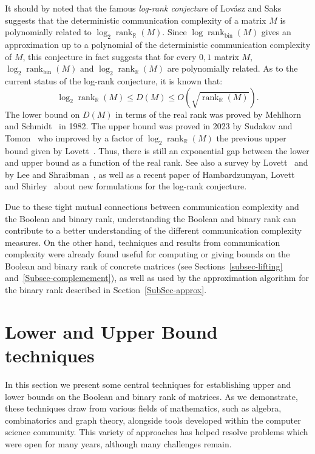 \documentclass[11pt]{article}
\newcommand{\rank}{\mathop{\mathrm{rank}}}
\newcommand{\Rbin}{{\rank}_{\mathrm{bin}}}
\newcommand{\Rreal}{{\rank}_\mathbb{R}}
\begin{document}
It should by noted that the famous {\em log-rank conjecture} of Lov{\'a}sz and Saks~\cite{LovaszS88} suggests
that the deterministic communication complexity of a matrix $M$ is polynomially related to $\log_2 \Rreal(M)$.
Since $\log \Rbin(M)$ gives an approximation up to a polynomial of the deterministic communication complexity of $M$,
this conjecture in fact suggests that for every $0,1$ matrix $M$, $\log_2 \Rbin(M)$ and $\log_2 \Rreal(M)$ are polynomially related.
As to the current status of the log-rank conjecture, it is known that:
$$\log_2 \Rreal(M) \leq D(M) \leq O(\sqrt{\Rreal(M)}).$$
The lower bound on $D(M)$ in terms of the real rank was proved by Mehlhorn and Schmidt~\cite{mehlhorn1982vegas} in 1982.
The upper bound was proved in 2023 by Sudakov and Tomon~\cite{sudakov2023matrix} who improved by a factor of $\log_2 \Rreal(M)$ the previous upper bound given by Lovett~\cite{Shachar}.
Thus, there is still an exponential gap between the lower and upper bound as a function of the real rank.
See also a survey by Lovett~\cite{LovettA14} and by Lee and Shraibman~\cite{lee2023around},
as well as a recent paper of Hambardzumyan,  Lovett and Shirley~\cite{hambardzumyan2025log} about new formulations for the log-rank conjecture.

Due to these tight mutual connections between communication complexity and the Boolean and binary rank,
understanding the Boolean and binary rank can contribute to a better understanding of the different communication complexity measures.
On the other hand, techniques and results from communication complexity were already found useful for computing or giving bounds on
the Boolean and binary rank of concrete matrices (see Sections~\ref{subsec-lifting} and~\ref{Subsec-complemement}),
as well as used by the approximation algorithm for the binary rank described in Section~\ref{SubSec-approx}.


\section{Lower and Upper Bound techniques}
\label{Sec-lower-and-upper}

In this section we present some central techniques for establishing upper and lower bounds on the Boolean and binary rank of matrices.
As we demonstrate, these techniques draw from various fields of mathematics, such as algebra, combinatorics and graph theory,
alongside tools developed within the computer science community.
This variety of approaches has helped resolve problems which were open for many years, although many challenges remain.
\end{document}
